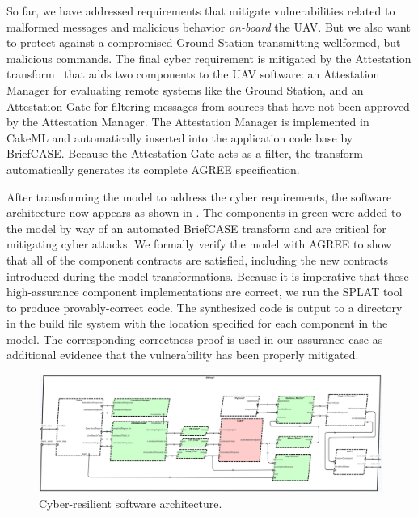 So far, we have addressed requirements that
mitigate vulnerabilities related to malformed messages and malicious behavior \textit{on-board} the UAV.  But we also want to protect against a compromised Ground Station transmitting wellformed, but malicious commands. The final cyber requirement is mitigated by the Attestation transform~\cite{attestation-copland} that adds two components to the UAV software: an Attestation Manager for evaluating remote systems like the Ground Station, and an Attestation Gate for filtering messages from sources that have not been approved by the Attestation Manager.  The Attestation Manager is implemented in CakeML and automatically inserted into the application code base by BriefCASE.  Because the Attestation Gate acts as a filter, the transform automatically generates its complete AGREE specification.%


After transforming the model to address the cyber requirements, the software architecture now appears as shown in .  The components in green were added to the model by way of an automated BriefCASE transform and are critical for mitigating cyber attacks.
We formally verify the model with AGREE to show that all of the component contracts are satisfied, including the new contracts introduced during the model transformations.
Because it is imperative that these high-assurance component implementations are correct,
we run the SPLAT tool to produce provably-correct code.
The synthesized code is output to a directory in the build file system with the location specified for each component in the model.  The corresponding correctness proof is used in our assurance case as additional evidence that the vulnerability has been properly mitigated.

\begin{figure}[h]
	\centering
	\includegraphics[width=1\columnwidth]{figs/hardened-sw.png}
	\caption{Cyber-resilient software architecture.}
	\label{fig:hardened-sw}
\end{figure}

